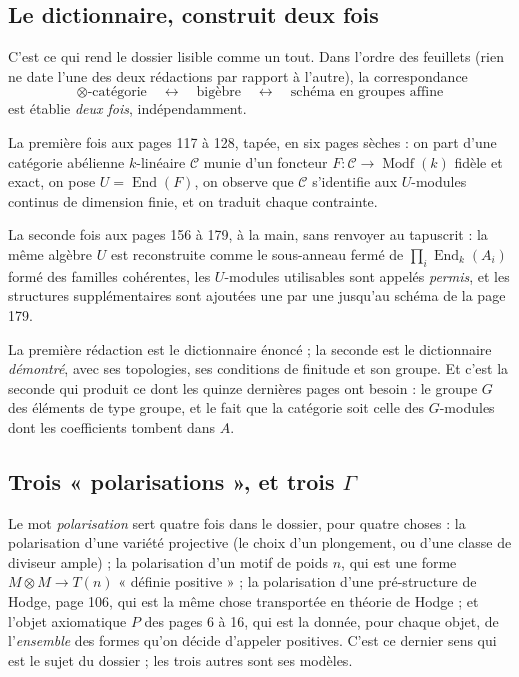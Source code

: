 \documentclass[11pt,a4paper]{article}
\begin{document}
\subsection*{Le dictionnaire, construit deux fois}

C'est ce qui rend le dossier lisible comme un tout. Dans l'ordre des
feuillets (rien ne date l'une des deux rédactions par rapport à l'autre), la
correspondance
\[
\otimes\text{-catégorie} \quad\longleftrightarrow\quad
\text{bigèbre} \quad\longleftrightarrow\quad
\text{schéma en groupes affine}
\]
est établie \emph{deux fois}, indépendamment.

La première fois aux pages 117 à 128, tapée, en six pages sèches : on part
d'une catégorie abélienne $k$-linéaire $\mathcal{C}$ munie d'un foncteur
$F \colon \mathcal{C} \to \operatorname{Modf}(k)$ fidèle et exact, on pose
$U = \operatorname{End}(F)$, on observe que $\mathcal{C}$ s'identifie aux
$U$-modules continus de dimension finie, et on traduit chaque contrainte.

La seconde fois aux pages 156 à 179, à la main, sans renvoyer au tapuscrit : la même
algèbre $U$ est reconstruite comme le sous-anneau fermé de $\prod_{i}
\operatorname{End}_{k}(A_{i})$ formé des familles cohérentes, les
$U$-modules utilisables sont appelés \emph{permis}, et les structures
supplémentaires sont ajoutées une par une jusqu'au schéma de la page 179.

La première rédaction est le dictionnaire
énoncé ; la seconde est le dictionnaire \emph{démontré}, avec ses topologies,
ses conditions de finitude et son groupe. Et c'est la seconde qui produit ce
dont les quinze dernières pages ont besoin : le groupe $G$ des éléments de type
groupe, et le fait que la catégorie soit celle des $G$-modules dont les
coefficients tombent dans $A$.

\subsection*{Trois « polarisations », et trois $\Gamma$}

Le mot \emph{polarisation} sert quatre fois dans le dossier, pour quatre
choses : la polarisation d'une variété projective (le choix d'un plongement, ou
d'une classe de diviseur ample) ; la polarisation d'un motif de poids $n$, qui
est une forme $M \otimes M \to T(n)$ « définie positive » ; la polarisation
d'une pré-structure de Hodge, page 106, qui est la même chose transportée en
théorie de Hodge ; et l'objet axiomatique $P$ des pages 6 à 16, qui est la
donnée, pour chaque objet, de l'\emph{ensemble} des formes qu'on décide
d'appeler positives. C'est ce dernier sens qui est le sujet du dossier ; les
trois autres sont ses modèles.
\end{document}
